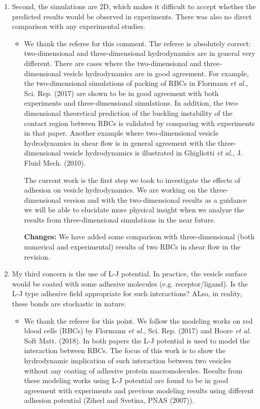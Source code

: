 \documentclass[11pt]{article}
\newcommand{\comment}[1]{{\color{blue} #1}}
\begin{document}
\begin{enumerate}
\noindent
\item\comment{Second, the simulations are 2D, which makes it difficult to accept
whether the predicted results would be observed in experiments. There
was also no direct comparison with any experimental studies.}
\begin{itemize}
  \item We thank the referee for this comment. The referee is absolutely correct: two-dimensional and three-dimensional hydrodynamics are in general very different. There are
  cases where the two-dimensional and three-dimensional  vesicle hydrodynamics are in good agreement. For example, the two-dimensional simulations of packing of RBCs in Flormann {\it et al.}, Sci. Rep. (2017) are shown to be in good agreement with both experiments and three-dimensional simulations. In addition, the two-dimensional theoretical prediction of the buckling instability of the contact region between RBCs is validated by comparing with experiments in that paper.
  Another example where two-dimensional vesicle hydrodynamics in shear flow is in general agreement with the three-dimensional vesicle hydrodynamics is illustrated in Ghigliotti {\it et al.}, J. Fluid Mech. (2010). 
  
  The current work is the first step we took to investigate the effects of adhesion on vesicle hydrodynamics. We are working on the three-dimensional version  and with the two-dimensional results as a guidance we will be able to elucidate more physical insight when we analyze the results from three-dimensional simulations in the near future.
  
  \noindent
  {\bf Changes:} We have added some comparison with three-dimensional (both numerical and experimental) results of two RBCs in shear flow in the revision.
\end{itemize}

\noindent
\item\comment{My third concern is the use of L-J potential. In practice, the
vesicle surface would be coated with some adhesive molecules (e.g.
receptor/ligand). Is the L-J type adhesive field appropriate for such
interactions? ALso, in reality, these bonds are stochastic in nature.}
\begin{itemize}
  \item We thank the referee for this point. We follow the modeling works on red blood cells (RBCs) by Flormann {\it et al.}, Sci. Rep. (2017) and Hoore {\it et al.} Soft Matt. (2018).
  In both papers the L-J potential is used to model the interaction between RBCs. The focus of this work is to show the hydrodynamic implication of such interaction between two vesicles without any coating of adhesive protein macromolecules. Results from these modeling works using L-J potential are found to be in good agreement with experiments and previous modeling results using different adhesion potential (Ziherl and Svetina, PNAS (2007)).
  

\end{itemize}
\end{enumerate}
\end{document}
